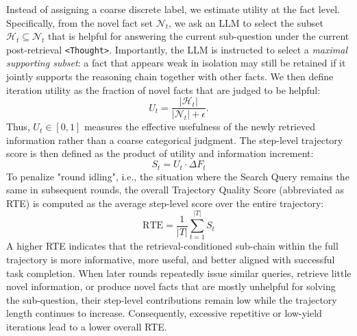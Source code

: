 Instead of assigning a coarse discrete label, we estimate utility at the fact level. Specifically, from the novel fact set $\mathcal{N}_t$, we ask an LLM to select the subset $\mathcal{H}_t \subseteq \mathcal{N}_t$ that is helpful for answering the current sub-question under the current post-retrieval \texttt{<Thought>}. Importantly, the LLM is instructed to select a \emph{maximal supporting subset}: a fact that appears weak in isolation may still be retained if it jointly supports the reasoning chain together with other facts. We then define iteration utility as the fraction of novel facts that are judged to be helpful:
\begin{equation}
    U_t = \dfrac{\left| \mathcal{H}_t \right|}{\left| \mathcal{N}_t \right| + \epsilon}.
\end{equation}
Thus, $U_t \in [0,1]$ measures the effective usefulness of the newly retrieved information rather than a coarse categorical judgment. The step-level trajectory score is then defined as the product of utility and information increment:
\begin{equation}
    S_t = U_t \cdot \Delta F_t
\end{equation}
To penalize "round idling", i.e., the situation where the Search Query remains the same in subsequent rounds, the overall Trajectory Quality Score (abbreviated as RTE) is computed as the average step-level score over the entire trajectory:
\begin{equation}
    \mathrm{RTE} = \frac{1}{|T|}\sum_{t=1}^{|T|} S_t
\end{equation}
A higher RTE indicates that the retrieval-conditioned sub-chain within the full trajectory is more informative, more useful, and better aligned with successful task completion. When later rounds repeatedly issue similar queries, retrieve little novel information, or produce novel facts that are mostly unhelpful for solving the sub-question, their step-level contributions remain low while the trajectory length continues to increase. Consequently, excessive repetitive or low-yield iterations lead to a lower overall RTE.
